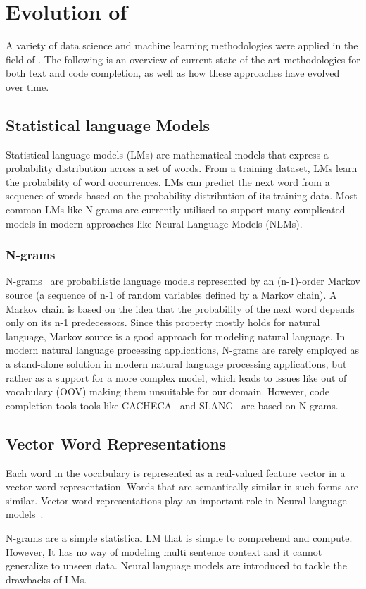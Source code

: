 \section{Evolution of \cct{}}
A variety of data science and machine learning methodologies were applied in the field of \cct{}. The following is an overview of current state-of-the-art methodologies for both text and code completion, as well as how these approaches have evolved over time.

\subsection{Statistical language Models}
Statistical language models (LMs) are mathematical models that express a probability distribution across a set of words. From a training dataset, LMs learn the probability of word occurrences. LMs can predict the next word from a sequence of words based on the probability distribution of its training data. Most common LMs like N-grams are currently utilised to support many complicated models in modern approaches like Neural Language Models (NLMs).

\subsubsection{N-grams}
N-grams~\cite{ngram} are probabilistic language models represented by an (n-1)-order Markov source (a sequence of n-1 of random variables defined by a Markov chain). A Markov chain is based on the idea that the probability of the next word depends only on its n-1 predecessors. Since this property mostly holds for natural language, Markov source is a good approach for modeling natural language. In modern natural language processing applications, N-grams are rarely employed as a stand-alone solution in modern natural language processing applications, but rather as a support for a more complex model, which leads to issues like out of vocabulary (OOV) making them unsuitable for our domain. However, code completion tools tools like CACHECA~\cite{cacheca} and SLANG~\cite{slang} are based on N-grams.

\subsection{Vector Word Representations}
Each word in the vocabulary is represented as a real-valued feature vector in a vector word representation. Words that are semantically similar in such forms are similar. Vector word representations play an important role in Neural language models~\cite{mnlm}.
 
N-grams are a simple statistical LM that is simple to comprehend and compute. However, It has no way of modeling multi sentence context and it cannot generalize to unseen data. Neural language models are introduced to tackle the drawbacks of LMs.